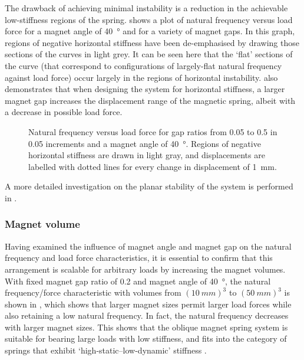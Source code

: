 \documentclass[11pt,a4paper]{memoir}
\begin{document}
The drawback of achieving minimal instability is a reduction in the achievable low-stiffness regions of the spring.
 shows a plot of natural frequency versus load force for a magnet angle of \SI{40}{\degree} and for a variety of magnet gaps.
In this graph, regions of negative horizontal stiffness have been de-emphasised by drawing those sections of the curves in light grey.
It can be seen here that the `flat' sections of the curve (that correspond to configurations of largely-flat natural frequency against load force) occur largely in the regions of horizontal instability.
 also demonstrates that when designing the system for horizontal stiffness, a larger magnet gap increases the displacement range of the magnetic spring, albeit with a decrease in possible load force.

\begin{figure}
\centering
{}
\caption{Natural frequency versus load force for gap ratios from \num{0.05} to \num{0.5} in \num{0.05} increments and a magnet angle of \SI{40}{\degree}.
Regions of negative horizontal stiffness are drawn in light gray, and displacements are labelled with dotted lines for every change in displacement of \SI{1}{mm}.}
\end{figure}

A more detailed investigation on the planar stability of the system is performed in .


\subsubsection{Magnet volume}

Having examined the influence of magnet angle and magnet gap on the natural frequency and load force characteristics, it is essential to confirm that this arrangement is scalable for arbitrary loads by increasing the magnet volumes.
With fixed magnet gap ratio of 0.2 and magnet angle of \SI{40}{\degree}, the natural frequency/force characteristic with volumes from $(\SI{10}{mm})^3$ to $(\SI{50}{mm})^3$ is shown in , which shows that larger magnet sizes permit larger load forces while also retaining a low natural frequency.
In fact, the natural frequency decreases with larger magnet sizes.
This shows that the oblique magnet spring system is suitable for bearing large loads with low stiffness, and fits into the category of springs that exhibit `high-static--low-dynamic' stiffness \parencite[e.g.,][]{carrella2008-jsv}.
\end{document}
